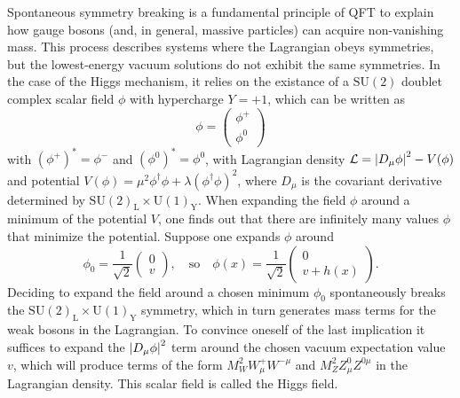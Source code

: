 Spontaneous symmetry breaking is a fundamental principle of QFT to explain how gauge bosons (and, in general, massive particles) can acquire non-vanishing mass. This process describes systems where the Lagrangian obeys symmetries, but the lowest-energy vacuum solutions do not exhibit the same symmetries. In the case of the Higgs mechanism, it relies on the existance of a $\text{SU}(2)$ doublet complex scalar field $\phi$ with hypercharge $Y = +1$, which can be written as 
\begin{equation*}
    \phi=
    \begin{pmatrix}
        \phi^{+} \\
        \phi^{0}
    \end{pmatrix}
\end{equation*}
with $(\phi^{+})^{*}=\phi^{-}$ and $(\phi^{0})^{*}=\phi^{0}$, with Lagrangian density $\mathcal{L}=\left\lvert D_{\mu}\phi\right\rvert^2 - V(\phi)$ and potential $V(\phi) = \mu^2\phi^\dag\phi+\lambda(\phi^\dag\phi)^2$, where $D_\mu$ is the covariant derivative determined by $\text{SU}(2)_{\text{L}}\times \text{U}(1)_{\text{Y}}$. When expanding the field $\phi$ around a minimum of the potential $V$, one finds out that there are infinitely many values $\phi$ that minimize the potential. Suppose one expands $\phi$ around
\begin{equation*}
    \phi_{0}=\frac{1}{\sqrt{2}}
    \begin{pmatrix}
        0 \\
        v
    \end{pmatrix},\quad \text{so}\quad
    \phi(x)=\frac{1}{\sqrt{2}}
    \begin{pmatrix}
        0 \\
        v + h(x)
    \end{pmatrix}.
\end{equation*}
Deciding to expand the field around a chosen minimum $\phi_{0}$ spontaneously breaks the $\text{SU}(2)_{\text{L}}\times \text{U}(1)_{\text{Y}}$ symmetry, which in turn generates mass terms for the weak bosons in the Lagrangian. To convince oneself of the last implication it suffices to expand the $\left\lvert D_{\mu}\phi\right\rvert^2$ term around the chosen vacuum expectation value $v$, which will produce terms of the form $M_{W}^2W_\mu^{+}W^{-\mu}$ and $M_{Z}^2Z_\mu^{0}Z^{0\mu}$ in the Lagrangian density. This scalar field is called the Higgs field.

